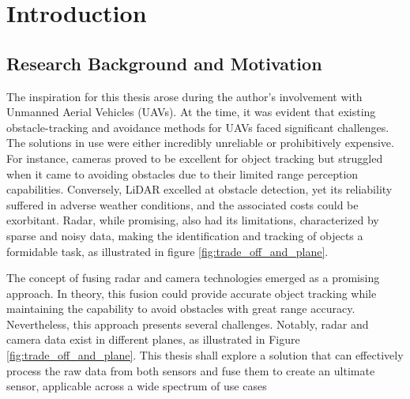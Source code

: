 \chapter{Introduction}\label{chap:intro}


\section{Research Background and Motivation}\label{sec:1-motivation}
The inspiration for this thesis arose during the author's involvement with Unmanned Aerial Vehicles (UAVs). 
At the time, it was evident that existing obstacle-tracking and avoidance methods for UAVs faced significant challenges. 
The solutions in use were either incredibly unreliable or prohibitively expensive.
For instance, cameras proved to be excellent for object tracking but struggled when it came to avoiding obstacles due to their limited range perception capabilities.
Conversely, LiDAR excelled at obstacle detection, yet its reliability suffered in adverse weather conditions, and the associated costs could be exorbitant. 
Radar, while promising, also had its limitations, characterized by sparse and noisy data, 
making the identification and tracking of objects a formidable task, as illustrated in figure \ref{fig:trade_off_and_plane}.

The concept of fusing radar and camera technologies emerged as a promising approach.
In theory, this fusion could provide accurate object tracking while maintaining the capability to avoid obstacles with great range accuracy. 
Nevertheless, this approach presents several challenges. 
Notably, radar and camera data exist in different planes, as illustrated in Figure \ref{fig:trade_off_and_plane}.
This thesis shall explore a solution that can effectively process the raw data from both sensors 
and fuse them to create an ultimate sensor, applicable across a wide spectrum of use cases

